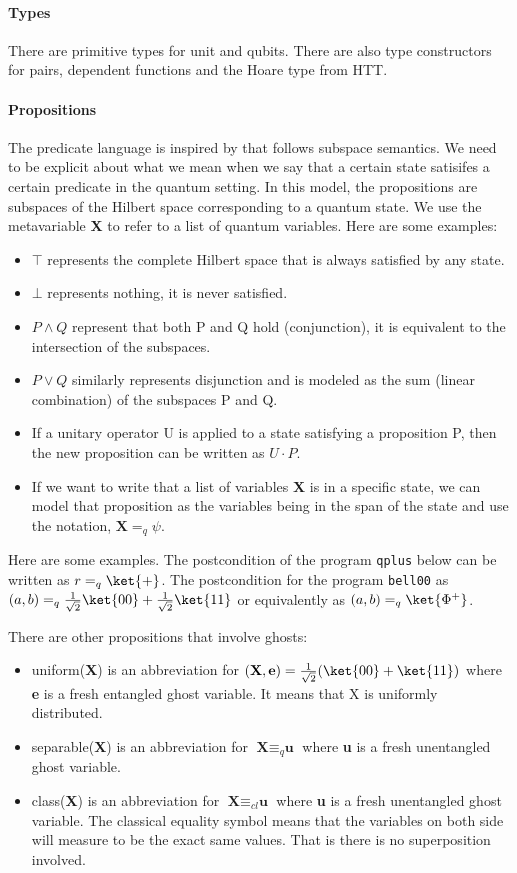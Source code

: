 \documentclass[acmsmall,nonacm,timestamp,review=false,anonymous=false]{acmart}
\begin{document}
\paragraph{Types} There are primitive types for unit and qubits. There are also type constructors for pairs, dependent functions and the Hoare type from HTT.

\paragraph{Propositions}
The predicate language is inspired by \citet{unruh2019} that follows subspace semantics. We need to be explicit about what we mean when we say that a certain state satisifes a certain predicate in the quantum setting. In this model, the propositions are subspaces of the Hilbert space corresponding to a quantum state. We use the metavariable \textbf{X} to refer to a list of quantum variables. Here are some examples:
\begin{itemize}
	\item $\top$ represents the complete Hilbert space that is always satisfied by any state.
	\item $\bot$ represents nothing, it is never satisfied.
	\item $P \wedge Q$ represent that both P and Q hold (conjunction), it is equivalent to the intersection of the subspaces.
	\item $P \vee Q$ similarly represents disjunction and is modeled as the sum (linear combination) of the subspaces P and Q.
	\item If a unitary operator U is applied to a state satisfying a proposition P, then the new proposition can be written as $U \cdot P$.
	\item If we want to write that a list of variables \textbf{X} is in a specific state, we can model that proposition as the variables being in the span of the state and use the notation, $\textbf{X} =_q \psi$.
\end{itemize}

Here are some examples. The postcondition of the program \texttt{qplus} below can be written as $r =_q \ket{+}$. The postcondition for the program \texttt{bell00} as $(a, b) =_q \frac{1}{\sqrt{2}}\ket{00}+\frac{1}{\sqrt{2}}\ket{11}$ or equivalently as $(a, b) =_q \ket{\Phi^+}$.

There are other propositions that involve ghosts:
\begin{itemize}
	\item uniform(\textbf{X}) is an abbreviation for $(\textbf{X}, \textbf{e}) = \frac{1}{\sqrt{2}}(\ket{00}+\ket{11})$ where \textbf{e} is  a fresh entangled ghost variable. It means that X is uniformly distributed.
	\item separable(\textbf{X}) is an abbreviation for $\textbf{X} \equiv_{q} \textbf{u}$ where \textbf{u} is a fresh unentangled ghost variable.
	\item class(\textbf{X}) is an abbreviation for $\textbf{X} \equiv_{cl} \textbf{u}$ where \textbf{u} is a fresh unentangled ghost variable. The classical equality symbol means that the variables on both side will measure to be the exact same values. That is there is no superposition involved.
\end{itemize}
\end{document}
